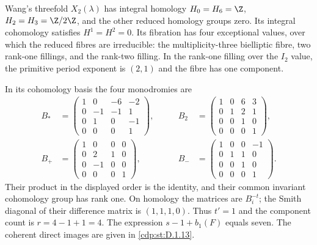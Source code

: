 \begin{proposition}\hypertarget{tag-01G4}{}\label{cdp:st:D.1.6}
Wang's threefold $X_2(\lambda)$ has integral homology
$H_0=H_6=\Z$, $H_2=H_3=\Z/2\Z$, and the other reduced
homology groups zero. Its integral cohomology satisfies
$H^1=H^2=0$. Its fibration has four exceptional values, over which
the reduced fibres are irreducible: the multiplicity-three
bielliptic fibre, two rank-one fillings, and the rank-two filling.
In the rank-one filling over the $I_2$ value, the primitive period
exponent is $(2,1)$ and the fibre has one component.

In its cohomology basis the four monodromies are
\[
\begin{aligned}
B_*&=\begin{pmatrix}1&0&-6&-2\\0&-1&-1&1\\0&1&0&-1\\0&0&0&1\end{pmatrix},&\qquad
B_2&=\begin{pmatrix}1&0&6&3\\0&1&2&1\\0&0&1&0\\0&0&0&1\end{pmatrix},\\
B_+&=\begin{pmatrix}1&0&0&0\\0&2&1&0\\0&-1&0&0\\0&0&0&1\end{pmatrix},&\qquad
B_-&=\begin{pmatrix}1&0&0&-1\\0&1&1&0\\0&0&1&0\\0&0&0&1\end{pmatrix}.
\end{aligned}
\]
Their product in the displayed order is the identity, and their
common invariant cohomology group has rank one. On homology the
matrices are $B_i^{-t}$; the Smith diagonal of their difference
matrix is $(1,1,1,0)$. Thus $t'=1$ and the component count is
$r=4-1+1=4$. The expression $s-1+b_1(F)$ equals seven.
The coherent direct images are given in \cref{cdp:st:D.1.13}.
\end{proposition}
